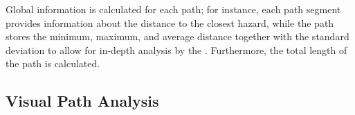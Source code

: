 Global information is calculated for each path; for instance, each path segment provides information about the distance to the closest hazard, while the path stores the minimum, maximum, and average distance together with the standard deviation to allow for in-depth analysis by the \IC. Furthermore, the total length of the path is calculated. 

\subsection{Visual Path Analysis} \label{sec:overview:analysis}
\begin{figure}
    \newlength{\mysize}
    \setlength{\mysize}{0.32\textwidth}
    \centering
\end{figure}

